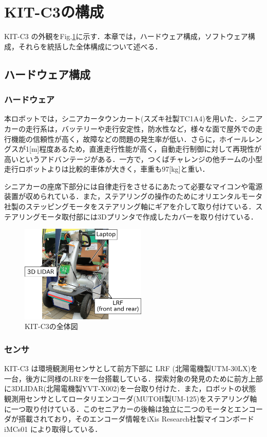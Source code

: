 \documentclass[10pt,a4paper]{jarticle}
\begin{document}
\section{KIT-C3の構成}
KIT-C3 の外観をFig.\ref{kitc3_robot}に示す．本章では，ハードウェア構成，ソフトウェア構成，それらを統括した全体構成について述べる．
\subsection{ハードウェア構成}
\subsubsection{ハードウェア}
本ロボットでは，シニアカータウンカート(スズキ社製TC1A4)を用いた．シニアカーの走行系は，バッテリーや走行安定性，防水性など，様々な面で屋外での走行機能の信頼性が高く，故障などの問題の発生率が低い．さらに，ホイールレングスが1[m]程度あるため，直進走行性能が高く，自動走行制御に対して再現性が高いというアドバンテージがある．一方で，つくばチャレンジの他チームの小型走行ロボットよりは比較的車体が大きく，車重も97[kg]と重い．

シニアカーの座席下部分には自律走行をさせるにあたって必要なマイコンや電源装置が収められている．また，ステアリングの操作のためにオリエンタルモータ社製のステッピングモータをステアリング軸にギアを介して取り付けている．ステアリングモータ取付部には3Dプリンタで作成したカバーを取り付けている．

\begin{figure}[bt]
 \centering
 \includegraphics[width=6cm]{./fig/png/thirdrobot_2016ver.png}
 \caption{KIT-C3の全体図}
  \label{kitc3_robot}
\end{figure}


\subsubsection{センサ}
KIT-C3 は環境観測用センサとして前方下部に LRF (北陽電機製UTM-30LX)を一台，後方に同様のLRFを一台搭載している．探索対象の発見のために前方上部に3DLIDAR(北陽電機製YVT-X002)を一台取り付けた．また，ロボットの状態観測用センサとしてロータリエンコーダ(MUTOH製UM-125)をステアリング軸に一つ取り付けている．このセニアカーの後輪は独立に二つのモータとエンコーダが搭載されており，そのエンコーダ情報をiXis Research社製マイコンボード iMCs01 により取得している．
\end{document}
